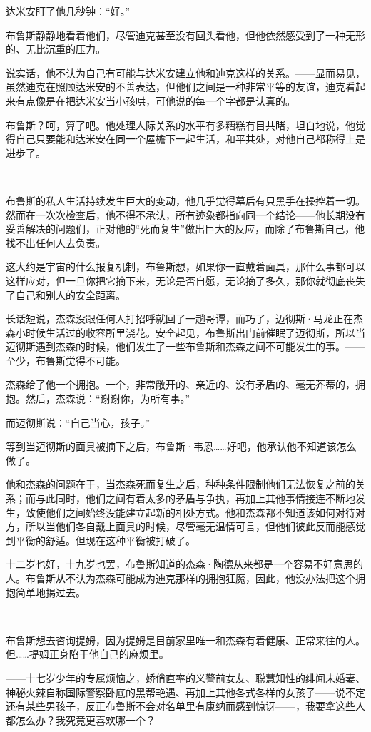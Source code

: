 \documentclass[../main]{subfiles}
\begin{document}
达米安盯了他几秒钟：“好。”

布鲁斯静静地看着他们，尽管迪克甚至没有回头看他，但他依然感受到了一种无形的、无比沉重的压力。

说实话，他不认为自己有可能与达米安建立他和迪克这样的关系。——显而易见，虽然迪克在照顾达米安的不善表达，但他们之间是一种非常平等的友谊，迪克看起来有点像是在把达米安当小孩哄，可他说的每一个字都是认真的。

布鲁斯？呵，算了吧。他处理人际关系的水平有多糟糕有目共睹，坦白地说，他觉得自己只要能和达米安在同一个屋檐下一起生活，和平共处，对他自己都称得上是进步了。

~\

布鲁斯的私人生活持续发生巨大的变动，他几乎觉得幕后有只黑手在操控着一切。然而在一次次检查后，他不得不承认，所有迹象都指向同一个结论——他长期没有妥善解决的问题们，正对他的“死而复生”做出巨大的反应，而除了布鲁斯自己，他找不出任何人去负责。

这大约是宇宙的什么报复机制，布鲁斯想，如果你一直戴着面具，那什么事都可以这样应对，但一旦你把它摘下来，无论是否自愿，无论摘了多久，那你就彻底丧失了自己和别人的安全距离。

长话短说，杰森没跟任何人打招呼就回了一趟哥谭，而巧了，迈彻斯·马龙正在杰森小时候生活过的收容所里浇花。安全起见，布鲁斯出门前催眠了迈彻斯，所以当迈彻斯遇到杰森的时候，他们发生了一些布鲁斯和杰森之间不可能发生的事。——至少，布鲁斯觉得不可能。

杰森给了他一个拥抱。一个，非常敞开的、亲近的、没有矛盾的、毫无芥蒂的，拥抱。然后，杰森说：“谢谢你，为所有事。”

而迈彻斯说：“自己当心，孩子。”

等到当迈彻斯的面具被摘下之后，布鲁斯·韦恩……好吧，他承认他不知道该怎么做了。

他和杰森的问题在于，当杰森死而复生之后，种种条件限制他们无法恢复之前的关系；而与此同时，他们之间有着太多的矛盾与争执，再加上其他事情接连不断地发生，致使他们之间始终没能建立起新的相处方式。他和杰森都不知道该如何对待对方，所以当他们各自戴上面具的时候，尽管毫无温情可言，但他们彼此反而能感觉到平衡的舒适。但现在这种平衡被打破了。

十二岁也好，十九岁也罢，布鲁斯知道的杰森·陶德从来都是一个容易不好意思的人。布鲁斯从不认为杰森可能成为迪克那样的拥抱狂魔，因此，他没办法把这个拥抱简单地揭过去。

~\

布鲁斯想去咨询提姆，因为提姆是目前家里唯一和杰森有着健康、正常来往的人。但……提姆正身陷于他自己的麻烦里。

——十七岁少年的专属烦恼之，娇俏直率的义警前女友、聪慧知性的绯闻未婚妻、神秘火辣自称国际警察卧底的黑帮艳遇、再加上其他各式各样的女孩子——说不定还有某些男孩子，反正布鲁斯不会对名单里有康纳而感到惊讶——，我要拿这些人都怎么办？我究竟更喜欢哪一个？
\end{document}

